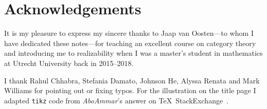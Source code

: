 \chapter{Acknowledgements}

It is my pleasure to express my sincere thanks to Jaap van Oosten---to whom I
have dedicated these notes---for teaching an excellent course on category
theory~\cite{vanOosten2016} and introducing me to realizability when I was a
master's student in mathematics at Utrecht University back in 2015--2018.

I thank Rahul Chhabra, Stefania Damato, Johnson He, Alyssa Renata and Mark
Williams for pointing out or fixing typos.
%
For the illustration on the title page I adapted \verb|tikz| code from
\emph{AboAmmar}'s answer on \TeX\ StackExchange~\cite{latex-triangle}.

